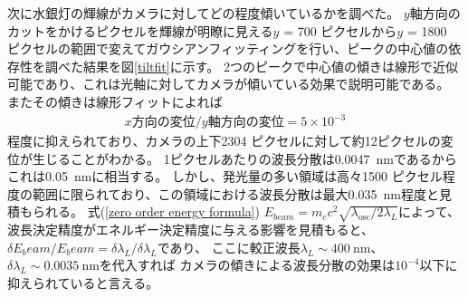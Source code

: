 \documentclass[a4paper,11pt,uplatex]{jsbook}
\begin{document}
次に水銀灯の輝線がカメラに対してどの程度傾いているかを調べた。
$y$軸方向のカットをかけるピクセルを輝線が明瞭に見える$y$ = 700 ピクセルから$y$ = 1800 ピクセルの範囲で変えてガウシアンフィッティングを行い、ピークの中心値の依存性を調べた結果を図\ref{tiltfit}に示す。
2つのピークで中心値の傾きは線形で近似可能であり、これは光軸に対してカメラが傾いている効果で説明可能である。
またその傾きは線形フィットによれば
\begin{eqnarray}
  x方向の変位 / y軸方向の変位 = 5 \times 10^{-3}
\end{eqnarray}
程度に抑えられており、カメラの上下2304 ピクセルに対して約12ピクセルの変位が生じることがわかる。
1ピクセルあたりの波長分散は0.0047~nmであるからこれは0.05~nmに相当する。
しかし、発光量の多い領域は高々1500 ピクセル程度の範囲に限られており、この領域における波長分散は最大0.035~nm程度と見積もられる。
式(\ref{zero order energy formula}) $E_{beam} =m_e c^2  \sqrt{\lambda_{\text{osc}}/2\lambda_L} $によって、波長決定精度がエネルギー決定精度に与える影響を見積もると、$\delta E_beam/E_beam = \delta \lambda_L/\delta \lambda_L$であり、
ここに較正波長$\lambda_L \sim 400~\text{nm}$、$\delta \lambda_L \sim 0.0035~\text{nm}$を代入すれば
カメラの傾きによる波長分散の効果は$10^{-4}$以下に抑えられていると言える。
\end{document}
